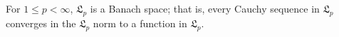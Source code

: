For $1 \leq p < \infty$, $\mathfrak{L}_p$ is a Banach space; that is, every Cauchy sequence in $\mathfrak{L}_p$ converges in the $\mathfrak{L}_p$ norm to a function in $\mathfrak{L}_p$.

